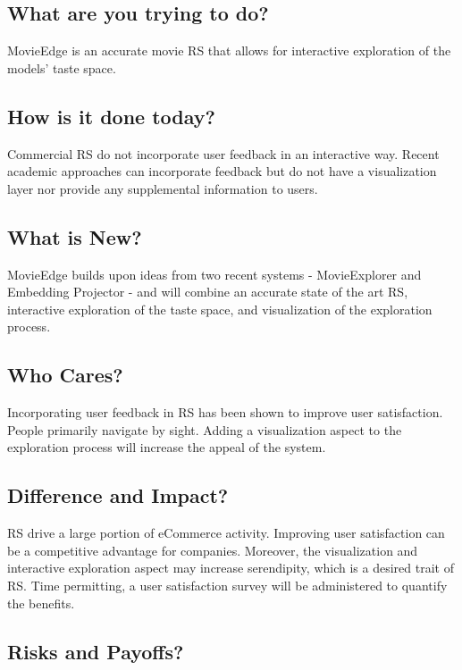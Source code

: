 \subsection{What are you trying to do?} 

MovieEdge is an accurate movie RS that allows for interactive exploration of the models’ taste space. 

\subsection{How is it done today?}

Commercial RS do not incorporate user feedback in an interactive way. Recent academic approaches can incorporate feedback but do not have a visualization layer nor provide any supplemental information to users.  

\subsection{What is New?}

MovieEdge builds upon ideas from two recent systems - MovieExplorer and Embedding Projector - and will combine an accurate state of the art RS, interactive exploration of the taste space, and visualization of the exploration process.  

\subsection{Who Cares?}

Incorporating user feedback in RS has been shown to improve user satisfaction. People primarily navigate by sight. Adding a visualization aspect to the exploration process will increase the appeal of the system. 

\subsection{Difference and Impact?}

RS drive a large portion of eCommerce activity. Improving user satisfaction can be a competitive advantage for companies. Moreover, the visualization and interactive exploration aspect may increase serendipity, which is a desired trait of RS. Time permitting, a user satisfaction survey will be administered to quantify the benefits. 

\subsection{Risks and Payoffs?}

